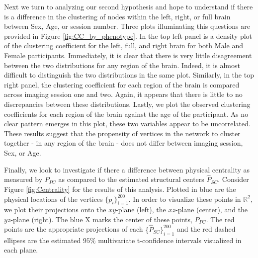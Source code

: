 \documentclass[01pt]{article}
\begin{document}
Next we turn to analyzing our second hypothesis and hope to understand if there is a difference in the clustering of nodes within the left, right, or full brain between Sex, Age, or session number. 
Three plots illuminating this questions are provided in Figure \ref{fig:CC_by_phenotype}. 
In the top left panel is a density plot of the clustering coefficient for the left, full, and right brain for both Male and Female participants. 
Immediately, it is clear that there is very little disagreement between the two distributions for any region of the brain. 
Indeed, it is almost difficult to distinguish the two distributions in the same plot. 
Similarly, in the top right panel, the clustering coefficient for each region of the brain is compared across imaging session one and two. 
Again, it appears that there is little to no discrepancies between these distributions. 
Lastly, we plot the observed clustering coefficients for each region of the brain against the age of the participant. 
As no clear pattern emerges in this plot, these two variables appear to be uncorrelated.
These results suggest that the propensity of vertices in the network to cluster together - in any region of the brain - does not differ between imaging session, Sex, or Age. 

Finally, we look to investigate if there a difference between physical centrality as measured by $P_{PC}$ as compared to the estimated structural centers $\hat{P}_{SC}$. 
Consider Figure \ref{fig:Centrality} for the results of this analysis. 
Plotted in blue are the physical locations of the vertices $\{p_i\}_{i=1}^{200}$. 
In order to visualize these points in $\mathbb{R}^2$, we plot their projections onto the $xy$-plane (left), the $xz$-plane (center), and the $yz$-plane (right).
The blue X marks the center of these points, $P_{PC}$.
The red points are the appropriate projections of each $\{\hat{P}_{SC}\}_{i=1}^{200}$ and the red dashed ellipses are the estimated $95\%$ multivariate t-confidence intervals visualized in each plane. 
\end{document}
